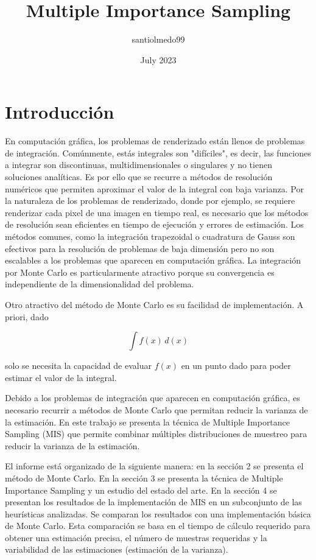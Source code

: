 \documentclass{article}
\title{Multiple Importance Sampling}
\author{santiolmedo99}
\date{July 2023}
\begin{document}
\maketitle

\section{Introducción}

En computación gráfica, los problemas de renderizado están llenos de problemas de integración.
Comúnmente, estás integrales son "difíciles", es decir, las funciones a integrar son discontinuas, multidimensionales o singulares y no tienen soluciones analíticas.
Es por ello que se recurre a métodos de resolución numéricos que permiten aproximar el valor de la integral con baja varianza.
Por la naturaleza de los problemas de renderizado, donde por ejemplo, se requiere renderizar cada pixel de una imagen en tiempo real, es necesario que los métodos de resolución sean eficientes en tiempo de ejecución y errores de estimación.
Los métodos comunes, como la integración trapezoidal o cuadratura de Gauss son efectivos para la resolución de problemas de baja dimensión pero no son escalables a los problemas que aparecen en computación gráfica.
La integración por Monte Carlo es particularmente atractivo porque su convergencia es independiente de la dimensionalidad del problema.

Otro atractivo del método de Monte Carlo es su facilidad de implementación. A priori, dado

$$ \int f(x) \,d(x)$$

solo se necesita la capacidad de evaluar $f(x)$ en un punto dado para poder estimar el valor de la integral.

Debido a los problemas de integración que aparecen en computación gráfica, es necesario recurrir a métodos de Monte Carlo que permitan reducir la varianza de la estimación.
En este trabajo se presenta la técnica de Multiple Importance Sampling (MIS) que permite combinar múltiples distribuciones de muestreo para reducir la varianza de la estimación.

El informe está organizado de la siguiente manera: en la sección 2 se presenta el método de Monte Carlo.
En la sección 3 se presenta la técnica de Multiple Importance Sampling y un estudio del estado del arte.
En la sección 4 se presentan los resultados de la implementación de MIS en un subconjunto de las heurísticas analizadas. Se comparan los resultados con una implementación básica de Monte Carlo.
Esta comparación se basa en el tiempo de cálculo requerido para obtener una estimación precisa, el número de muestras requeridas y la variabilidad de las estimaciones (estimación de la varianza).
\end{document}
